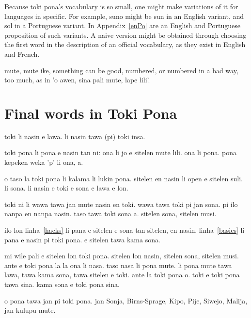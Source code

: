 \documentclass{article}
\begin{document}
Because toki pona's vocabulary is so small,
one might make variations of it for languages
in specific.
For example,
suno might be sun in an English variant,
and sol in a Portuguese variant.
In Appendix~\ref{enPo} are an English and Portuguese
proposition of such variants.
A naive version might be obtained through
choosing the first word in the description of
an official vocabulary, as they exist in English and French.



mute, mute ike,
something can be good, numbered,
or numbered in a bad way, too much,
as in 'o awen, sina pali mute, lape lili'.




% 


\section{Final words in Toki Pona}
toki li nasin e lawa.
li nasin tawa (pi) toki insa.

toki pona li pona e nasin tan ni:
ona li jo e sitelen mute lili.
ona li pona.
pona kepeken weka 'p' li ona, a.

o taso la toki pona li kalama li lukin pona.
sitelen en nasin li open e sitelen suli\cite{tpLang,pije,fb1,fb2,tokisona,Wikipesija}.
li sona. li nasin e toki e sona e lawa e lon.

toki ni li wawa tawa jan mute nasin en toki.
wawa tawa toki pi jan sona.
pi ilo nanpa en nanpa nasin.
taso tawa toki sona a.
sitelen sona, sitelen musi.

ilo lon linha~\ref{hacks} li pana e sitelen
e sona tan sitelen,
en nasin.
linha~\ref{basics} li pana e nasin pi toki pona.
e sitelen tawa kama sona.

mi wile pali e sitelen lon toki pona.
sitelen lon nasin, sitelen sona,
sitelen musi.
ante e toki pona la
la ona li nasa.
taso nasa li pona mute.
li pona mute tawa lawa,
tawa kama sona, tawa sitelen e toki.
ante la toki pona o.
toki e toki pona tawa sina.
kama sona e toki pona sina.

o pona tawa jan pi toki pona.
jan Sonja, Birns-Sprage, Kipo, Pije,
Siwejo, Malija, jan kulupu mute.
\end{document}
